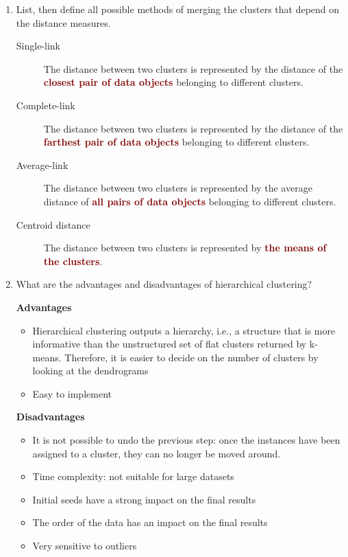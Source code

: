 \documentclass[12pt]{article}
\newenvironment{QandA}{\begin{enumerate}[label=\bfseries\arabic*.]\bfseries}
{\end{enumerate}}
\newenvironment{answered}{\par\normalfont\color{Sepia}}{}
\begin{document}
\begin{QandA}
    \item List, then define all possible methods of merging the clusters that depend on the distance measures.
    \begin{answered}
        \begin{description}
            \item[Single-link] The distance between two clusters is represented by 
                               the distance of the \textcolor{Maroon}{\textbf{closest pair of data objects}} 
                               belonging to different clusters.
            \item[Complete-link] The distance between two clusters is represented by 
                                 the distance of the \textcolor{Maroon}{\textbf{farthest pair of data objects}} 
                                 belonging to different clusters.
            \item[Average-link] The distance between two clusters is represented by 
                                the average distance of \textcolor{Maroon}{\textbf{all pairs of data objects}} 
                                belonging to different clusters.
            \item[Centroid distance] The distance between two clusters is represented by 
                                     \textcolor{Maroon}{\textbf{the means of the clusters}}.
        \end{description}
    \end{answered}

    \item What are the advantages and disadvantages of hierarchical clustering?
    \begin{answered}
        \textbf{Advantages} 
        \begin{itemize}
            \item Hierarchical clustering outputs a hierarchy, i.e., a 
                structure that is more informative than the unstructured 
                set of flat clusters returned by k-means. Therefore, it is 
                easier to decide on the number of clusters by looking at the dendrograms 
            \item Easy to implement 
        \end{itemize}
        \textbf{Disadvantages}
        \begin{itemize}
            \item It is not possible to undo the previous step: once the 
                instances have been assigned to a cluster, they can no 
                longer be moved around.
            \item Time complexity: not suitable for large datasets 
            \item Initial seeds have a strong impact on the final results
            \item The order of the data has an impact on the final results
            \item Very sensitive to outliers
        \end{itemize}
    \end{answered}

\end{QandA}
\end{document}
